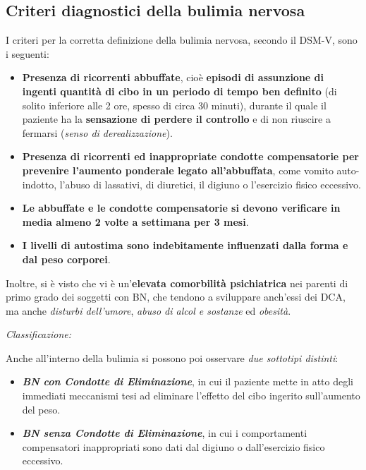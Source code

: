 \subsection{Criteri diagnostici della bulimia nervosa}

I criteri per la corretta definizione della bulimia nervosa, secondo il
DSM-V, sono i seguenti:

\begin{itemize}
\item
  \textbf{Presenza di ricorrenti abbuffate}, cioè \textbf{episodi di
  assunzione di ingenti quantità di cibo in un periodo di tempo ben
  definito} (di solito inferiore alle 2 ore, spesso di circa 30 minuti),
  durante il quale il paziente ha la \textbf{sensazione di perdere il
  controllo} e di non riuscire a fermarsi (\emph{senso di
  derealizzazione}).
\item
  \textbf{Presenza di ricorrenti ed inappropriate condotte compensatorie
  per prevenire l'aumento ponderale legato all'abbuffata}, come vomito
  auto-indotto, l'abuso di lassativi, di diuretici, il digiuno o
  l'esercizio fisico eccessivo.
\item
  \textbf{Le abbuffate e le condotte compensatorie si devono verificare
  in media almeno 2 volte a settimana per 3 mesi}.
\item
  \textbf{I livelli di autostima sono indebitamente influenzati dalla
  forma e dal peso corporei}.
\end{itemize}

Inoltre, si è visto che vi è un'\textbf{elevata comorbilità
psichiatrica} nei parenti di primo grado dei soggetti con BN, che
tendono a sviluppare anch'essi dei DCA, ma anche \emph{disturbi
dell'umore}, \emph{abuso di alcol e sostanze} ed \emph{obesità}.

\emph{\emph{Classificazione:}}

Anche all'interno della bulimia si possono poi osservare \emph{due
sottotipi distinti}:

\begin{itemize}
\item
  \textbf{\emph{BN con Condotte di Eliminazione}}, in cui il paziente
  mette in atto degli immediati meccanismi tesi ad eliminare l'effetto
  del cibo ingerito sull'aumento del peso.
\item
  \textbf{\emph{BN senza Condotte di Eliminazione}}, in cui i
  comportamenti compensatori inappropriati sono dati dal digiuno o
  dall'esercizio fisico eccessivo.
\end{itemize}

